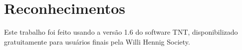 \documentclass[12pt]{article}
\begin{document}
\section*{Reconhecimentos}
Este trabalho foi feito usando a versão 1.6 do software TNT, disponibilizado gratuitamente para usuários finais pela Willi Hennig Society.



\end{document}
